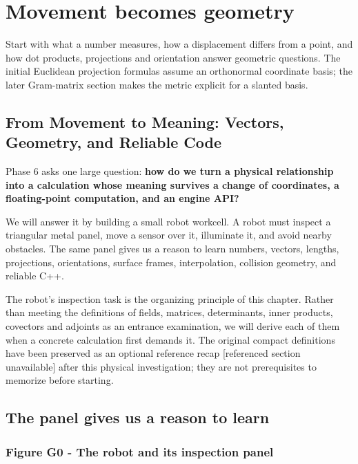 \chapter{Movement becomes geometry}\label{01-foundations-i-ch017-movement-becomes-geometry}

Start with what a number measures, how a displacement differs from a point, and how dot products, projections and orientation answer geometric questions. The initial Euclidean projection formulas assume an orthonormal coordinate basis; the later Gram-matrix section makes the metric explicit for a slanted basis.

\section{From Movement to Meaning: Vectors, Geometry, and Reliable Code}\label{01-foundations-i-ch017-from-movement-to-meaning-vectors-geometry-and-reliable-code}

Phase 6 asks one large question: \textbf{how do we turn a physical relationship into a calculation whose meaning survives a change of coordinates, a floating-point computation, and an engine API?}

We will answer it by building a small robot workcell. A robot must inspect a triangular metal panel, move a sensor over it, illuminate it, and avoid nearby obstacles. The same panel gives us a reason to learn numbers, vectors, lengths, projections, orientations, surface frames, interpolation, collision geometry, and reliable C++.

The robot's inspection task is the organizing principle of this chapter. Rather than meeting the definitions of fields, matrices, determinants, inner products, covectors and adjoints as an entrance examination, we will derive each of them when a concrete calculation first demands it. The original compact definitions have been preserved as an optional {reference recap {[}referenced section unavailable{]}} after this physical investigation; they are not prerequisites to memorize before starting.

\section{The panel gives us a reason to learn}\label{01-foundations-i-ch017-the-panel-gives-us-a-reason-to-learn}

\subsection{Figure G0 - The robot and its inspection panel}\label{01-foundations-i-ch017-figure-g0---the-robot-and-its-inspection-panel}

